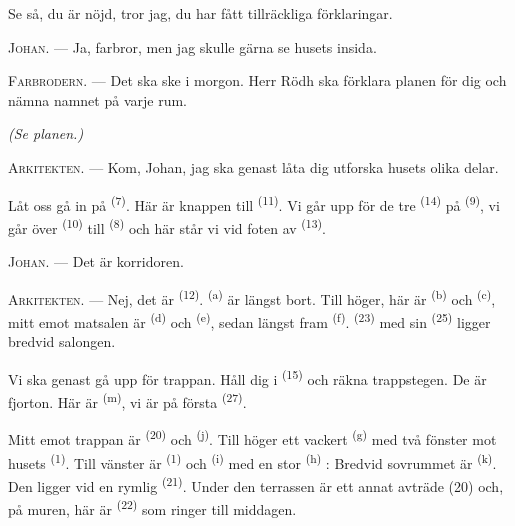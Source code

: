 Se så, du är nöjd, tror jag, du har fått tillräckliga förklaringar.

\textsc{Johan}. --- Ja, farbror, men jag skulle gärna se husets insida.

\textsc{Farbrodern}. --- Det ska ske i morgon. Herr Rödh ska förklara planen för dig och nämna
namnet på varje rum.

\VUsaut{3.0mm}
\VUsaut{2.4mm}

{\centering\textit{(Se planen.)}\par}
\VUsaut{2.4mm}

\textsc{Arkitekten}. --- Kom, Johan, jag ska genast låta dig utforska husets olika delar.

Låt oss gå in på  \textsuperscript{(7)}. Här är knappen till
 \textsuperscript{(11)}. Vi går upp för de tre
 \textsuperscript{(14)} på 
\textsuperscript{(9)}, vi går över  \textsuperscript{(10)} till
 \textsuperscript{(8)} och här står vi vid foten av
 \textsuperscript{(13)}.

\textsc{Johan}. --- Det är korridoren.

\textsc{Arkitekten}. --- Nej, det är  \textsuperscript{(12)}.
 \textsuperscript{(a)} är längst bort. Till höger, här är
 \textsuperscript{(b)} och 
\textsuperscript{(c)}, mitt emot matsalen är  \textsuperscript{(d)} och
 \textsuperscript{(e)}, sedan längst fram 
\textsuperscript{(f)}.  \textsuperscript{(23)} med sin 
\textsuperscript{(25)} ligger bredvid salongen.

Vi ska genast gå upp för trappan. Håll dig i  \textsuperscript{(15)} och
räkna trappstegen. De är fjorton. Här är
 \textsuperscript{(m)}, vi är på första 
\textsuperscript{(27)}.

\VUsaut{3.0mm}
\VUsaut{3.0mm}

Mitt emot trappan är  \textsuperscript{(20)} och
 \textsuperscript{(j)}. Till höger ett vackert
 \textsuperscript{(g)} med två fönster mot husets
 \textsuperscript{(1)}. Till vänster är 
\textsuperscript{(1)} och  \textsuperscript{(i)} med en stor
 \textsuperscript{(h)} : Bredvid sovrummet är
 \textsuperscript{(k)}. Den ligger vid en rymlig
 \textsuperscript{(21)}. Under den terrassen är ett annat avträde
(20) och, på muren, här är  \textsuperscript{(22)} som ringer till middagen.


